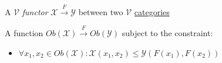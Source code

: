 A $\mathcal{V}$ \emph{functor} $\mathcal{X}\xrightarrow{F}\mathcal{Y}$ between two $\mathcal{V}$ \href{doc/1 math/Seven Sketches in Compositionality/Chapter 2: Resource theories/3 Enrichment/1 V-categories/1 V-category}{categories}

A function $Ob(\mathcal{X})\xrightarrow{F}Ob(\mathcal{Y})$ subject to the constraint:
\begin{itemize}
  \item $\forall x_1,x_2 \in Ob(\mathcal{X}): \mathcal{X}(x_1,x_2) \leq \mathcal{Y}(F(x_1),F(x_2))$
\end{itemize}
